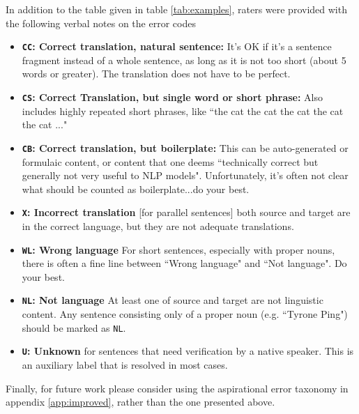 In addition to the table given in table \ref{tab:examples}, raters were provided with the following verbal notes on the error codes
\begin{itemize}
    \item \textbf{\texttt{CC}: Correct translation, natural sentence:} It's OK if it's a sentence fragment instead of a whole sentence, as long as it is not too short (about 5 words or greater). The translation does not have to be perfect.
    \item \textbf{\texttt{\texttt{CS}}: Correct Translation, but single word or short phrase:} Also includes highly repeated short phrases, like ``the cat the cat the cat the cat the cat ..."
    \item \textbf{\texttt{CB}: Correct translation, but boilerplate: } This can be auto-generated or formulaic content, or content that one deems ``technically correct but generally not very useful to NLP models". Unfortunately, it's often not clear what should be counted as boilerplate...do your best.
    \item \textbf{\texttt{X}: Incorrect translation} [for parallel sentences] both source and target are in the correct language, but they are not adequate translations.
    \item \textbf{\texttt{WL}: Wrong language} For short sentences, especially with proper nouns, there is often a fine line between ``Wrong language" and ``Not language". Do your best.
    \item \textbf{\texttt{NL}: Not language} At least one of source and target are not linguistic content. Any sentence consisting only of a proper noun (e.g. ``Tyrone Ping") should be marked as \texttt{NL}.
    \item \textbf{\texttt{U}: Unknown} for sentences that need verification by a native speaker. This is an auxiliary label that is resolved in most cases.
\end{itemize}


Finally, for future work please consider using the aspirational error taxonomy in appendix \ref{app:improved}, rather than the one presented above.


